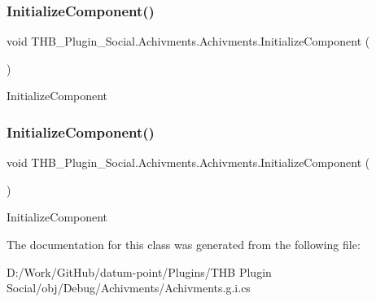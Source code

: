 \subsubsection{\texorpdfstring{Initialize\+Component()}{InitializeComponent()}\hspace{0.1cm}{\footnotesize\ttfamily [1/2]}}
{\footnotesize\ttfamily void T\+H\+B\+\_\+\+Plugin\+\_\+\+Social.\+Achivments.\+Achivments.\+Initialize\+Component (\begin{DoxyParamCaption}{ }\end{DoxyParamCaption})}



Initialize\+Component 

\mbox{\label{class_t_h_b___plugin___social_1_1_achivments_1_1_achivments_a6f673611ddba423db8bacc8dbdff7a00}} 
\subsubsection{\texorpdfstring{Initialize\+Component()}{InitializeComponent()}\hspace{0.1cm}{\footnotesize\ttfamily [2/2]}}
{\footnotesize\ttfamily void T\+H\+B\+\_\+\+Plugin\+\_\+\+Social.\+Achivments.\+Achivments.\+Initialize\+Component (\begin{DoxyParamCaption}{ }\end{DoxyParamCaption})}



Initialize\+Component 



The documentation for this class was generated from the following file\+:\begin{DoxyCompactItemize}
\item 
D\+:/\+Work/\+Git\+Hub/datum-\/point/\+Plugins/\+T\+H\+B Plugin Social/obj/\+Debug/\+Achivments/Achivments.\+g.\+i.\+cs\end{DoxyCompactItemize}
